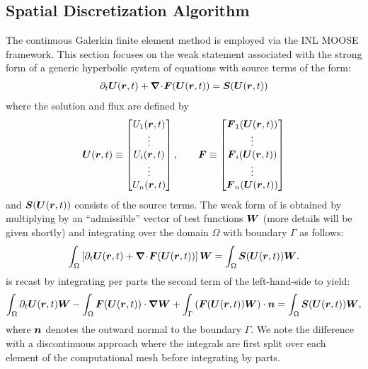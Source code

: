\subsection{Spatial Discretization Algorithm\label{sec:spatial_discretization}}
%
The continuous Galerkin finite element method is employed
via the INL MOOSE framework.  This section focuses on
the weak statement associated with the strong form of a generic hyperbolic system of equations with source terms of the form:
%
\begin{align}\label{eqn:va_system_notation}
\partial_t \boldsymbol U(\boldsymbol r, t) + \boldsymbol{\nabla}\! \cdot \! \boldsymbol F(\boldsymbol U(\boldsymbol r, t)) = \boldsymbol S(\boldsymbol U(\boldsymbol r, t))
\end{align}
where the solution and flux are defined by
\begin{align}
  \boldsymbol U(\boldsymbol r, t) \equiv
  \begin{bmatrix}
    U_1(\boldsymbol r, t)
    \\
    \vdots
    \\
    U_i(\boldsymbol r, t)
    \\
   \vdots
    \\
   U_n(\boldsymbol r, t)
  \end{bmatrix},
  \qquad
  \boldsymbol F \equiv
  \begin{bmatrix}
    \boldsymbol F_1(\boldsymbol U(\boldsymbol r, t))
    \\
    \vdots
    \\
    \boldsymbol F_i(\boldsymbol U(\boldsymbol r, t))
    \\
    \vdots
    \\
    \boldsymbol F_n(\boldsymbol U(\boldsymbol r, t))
  \end{bmatrix}
\end{align}
and $  \boldsymbol S(\boldsymbol U(\boldsymbol r, t))$ consists of the source
terms. 
%
The weak form of  is obtained by multiplying
by an ``admissible'' vector of test functions 
$\boldsymbol W$ (more details will be given shortly) and
integrating over the domain $\Omega$ with boundary $\Gamma$ as follows:
\begin{align}
  \label{en:va_system_weak}
  \int_{\Omega} \left[ \partial_t \boldsymbol U(\boldsymbol r, t) + \boldsymbol{\nabla}\! \cdot \! \boldsymbol F(\boldsymbol U(\boldsymbol r, t))\right]  \boldsymbol W 
  =  \int_{\Omega}  \boldsymbol S(\boldsymbol U(\boldsymbol r, t))  \boldsymbol W.
\end{align}
 is recast by integrating per parts the second term of the left-hand-side to yield:
\begin{align}
  \label{en:va_system_weak2}
  \int_\Omega \partial_t \boldsymbol U(\boldsymbol r, t)  \boldsymbol W -   \int_\Omega \boldsymbol F(\boldsymbol U(\boldsymbol r, t)) \cdot \boldsymbol{\nabla} \boldsymbol W 
+ \int_\Gamma \left( \boldsymbol F(\boldsymbol U(\boldsymbol r, t))  \boldsymbol W \right) \cdot \boldsymbol n   =  \int_{\Omega}  \boldsymbol S(\boldsymbol U(\boldsymbol r, t))  \boldsymbol W,
\end{align}
where $\boldsymbol n$ denotes the outward normal to the boundary $\Gamma$. We note the difference with a discontinuous approach where the integrals are first split over each element of the computational mesh before integrating by parts. 

